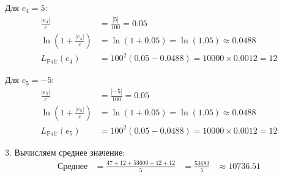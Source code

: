 \documentclass[12pt]{article}
\theoremstyle{definition}
\theoremstyle{definition}
\theoremstyle{definition}
\theoremstyle{remark}
\theoremstyle{remark}
\begin{document}
Для $e_4 = 5$:
\[
\begin{aligned}
\frac{|e_4|}{c} &= \frac{|5|}{100} = 0.05 \\
\ln\left(1 + \frac{|e_4|}{c}\right) &= \ln(1 + 0.05) = \ln(1.05) \approx 0.0488 \\
L_{\text{Fair}}(e_4) &= 100^2(0.05 - 0.0488) = 10000 \times 0.0012 = 12
\end{aligned}
\]

Для $e_5 = -5$:
\[
\begin{aligned}
\frac{|e_5|}{c} &= \frac{|-5|}{100} = 0.05 \\
\ln\left(1 + \frac{|e_5|}{c}\right) &= \ln(1 + 0.05) = \ln(1.05) \approx 0.0488 \\
L_{\text{Fair}}(e_5) &= 100^2(0.05 - 0.0488) = 10000 \times 0.0012 = 12
\end{aligned}
\]

3. Вычисляем среднее значение:
\[
\begin{aligned}
\text{Среднее} &= \frac{47 + 12 + 53600 + 12 + 12}{5} &= \frac{53683}{5} &\approx 10736.51
\end{aligned}
\]
\end{document}
